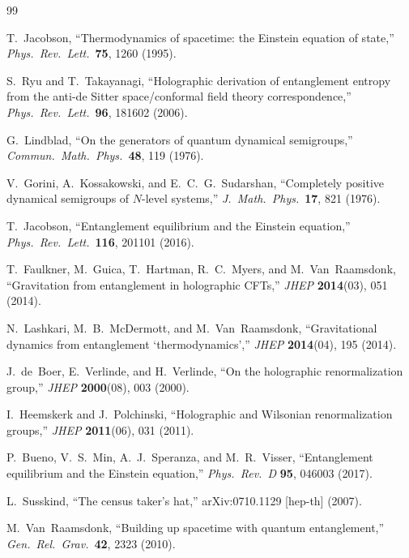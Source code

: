\documentclass[12pt,letterpaper]{article}
\theoremstyle{definition}
\theoremstyle{remark}
\begin{document}
\begin{thebibliography}{99}

T.~Jacobson,
``Thermodynamics of spacetime: the Einstein equation of state,''
\textit{Phys.\ Rev.\ Lett.}\ \textbf{75}, 1260 (1995).

S.~Ryu and T.~Takayanagi,
``Holographic derivation of entanglement entropy from the anti-de Sitter
space/conformal field theory correspondence,''
\textit{Phys.\ Rev.\ Lett.}\ \textbf{96}, 181602 (2006).

G.~Lindblad,
``On the generators of quantum dynamical semigroups,''
\textit{Commun.\ Math.\ Phys.}\ \textbf{48}, 119 (1976).

V.~Gorini, A.~Kossakowski, and E.~C.~G.~Sudarshan,
``Completely positive dynamical semigroups of $N$-level systems,''
\textit{J.\ Math.\ Phys.}\ \textbf{17}, 821 (1976).

T.~Jacobson,
``Entanglement equilibrium and the Einstein equation,''
\textit{Phys.\ Rev.\ Lett.}\ \textbf{116}, 201101 (2016).

T.~Faulkner, M.~Guica, T.~Hartman, R.~C.~Myers, and M.~Van~Raamsdonk,
``Gravitation from entanglement in holographic CFTs,''
\textit{JHEP} \textbf{2014}(03), 051 (2014).

N.~Lashkari, M.~B.~McDermott, and M.~Van~Raamsdonk,
``Gravitational dynamics from entanglement `thermodynamics',''
\textit{JHEP} \textbf{2014}(04), 195 (2014).

J.~de~Boer, E.~Verlinde, and H.~Verlinde,
``On the holographic renormalization group,''
\textit{JHEP} \textbf{2000}(08), 003 (2000).

I.~Heemskerk and J.~Polchinski,
``Holographic and Wilsonian renormalization groups,''
\textit{JHEP} \textbf{2011}(06), 031 (2011).

P.~Bueno, V.~S.~Min, A.~J.~Speranza, and M.~R.~Visser,
``Entanglement equilibrium and the Einstein equation,''
\textit{Phys.\ Rev.\ D} \textbf{95}, 046003 (2017).

L.~Susskind,
``The census taker's hat,''
arXiv:0710.1129 [hep-th] (2007).

M.~Van~Raamsdonk,
``Building up spacetime with quantum entanglement,''
\textit{Gen.\ Rel.\ Grav.}\ \textbf{42}, 2323 (2010).


\end{thebibliography}
\end{document}

